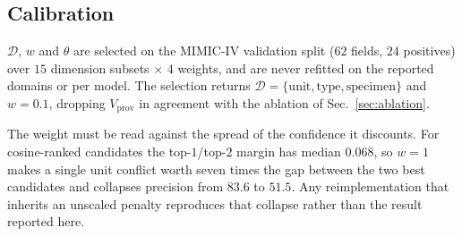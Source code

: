 \subsection{Calibration}
\label{sec:calib}

$\mathcal{D}$, $w$ and $\theta$ are selected on the MIMIC-IV validation split
($62$ fields, $24$ positives) over $15$ dimension subsets $\times$ $4$ weights, and are
never refitted on the reported domains or per model. The selection returns
$\mathcal{D}=\{\mathrm{unit},\mathrm{type},\mathrm{specimen}\}$ and $w{=}0.1$, dropping
$V_{\mathrm{prov}}$ in agreement with the ablation of Sec.~\ref{sec:ablation}.

The weight must be read against the spread of the confidence it discounts. For
cosine-ranked candidates the top-$1$/top-$2$ margin has median $0.068$, so $w{=}1$ makes
a single unit conflict worth seven times the gap between the two best candidates and
collapses precision from $83.6$ to $51.5$. Any reimplementation that inherits an unscaled
penalty reproduces that collapse rather than the result reported here.
